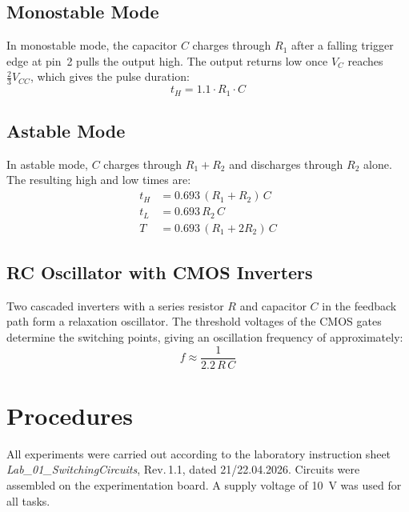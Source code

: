 \documentclass[12pt, a4paper]{article}
\begin{document}
\subsection{Monostable Mode}

In monostable mode, the capacitor $C$ charges through $R_1$ after a falling trigger
edge at pin~2 pulls the output high. The output returns low once $V_C$ reaches
$\tfrac{2}{3}V_{CC}$, which gives the pulse duration:
\begin{equation}
  t_H = 1.1 \cdot R_1 \cdot C
  \label{eq:mono_theory}
\end{equation}

\subsection{Astable Mode}

In astable mode, $C$ charges through $R_1 + R_2$ and discharges through $R_2$ alone.
The resulting high and low times are:
\begin{align}
  t_H &= 0.693\,(R_1 + R_2)\,C \label{eq:astable_th_theory}\\
  t_L &= 0.693\,R_2\,C         \label{eq:astable_tl_theory}\\
  T   &= 0.693\,(R_1 + 2R_2)\,C \label{eq:astable_T_theory}
\end{align}

\subsection{RC Oscillator with CMOS Inverters}

Two cascaded inverters with a series resistor $R$ and capacitor $C$ in the feedback
path form a relaxation oscillator. The threshold voltages of the CMOS gates determine
the switching points, giving an oscillation frequency of approximately:
\begin{equation}
  f \approx \frac{1}{2.2\,R\,C}
  \label{eq:inv_osc_theory}
\end{equation}

\section{Procedures}

All experiments were carried out according to the laboratory instruction sheet
\textit{Lab\_01\_SwitchingCircuits}, Rev.\,1.1, dated 21/22.04.2026. Circuits were
assembled on the experimentation board. A supply voltage of \SI{10}{\volt} was used
for all tasks.
\end{document}
